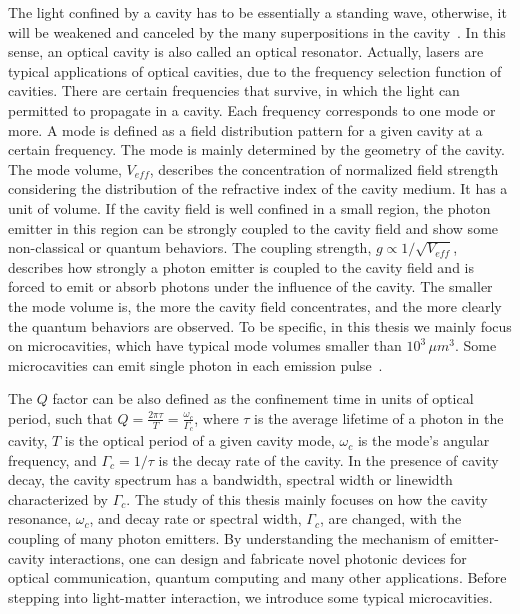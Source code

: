 The light confined by a cavity has to be essentially a standing wave, otherwise, it will be weakened and canceled by the many superpositions in the cavity~\cite{Novotny2006}. In this sense, an optical cavity is also called an optical resonator. Actually, lasers are typical applications of optical cavities, due to the frequency selection function of cavities. There are certain frequencies that survive, in which the light can permitted to propagate in a cavity. Each frequency corresponds to one mode or more. A mode is defined as a field distribution pattern for a given cavity at a certain frequency. The mode is mainly determined by the geometry of the cavity. The mode volume, $V_{eff}$, describes the concentration of normalized field strength considering the distribution of the refractive index of the cavity medium. It has a unit of volume. If the cavity field is well confined in a small region, the photon emitter in this region can be strongly coupled to the cavity field and show some non-classical or quantum behaviors. The coupling strength, $g\propto 1/\sqrt{V_{eff}}$, describes how strongly a photon emitter is coupled to the cavity field and is forced to emit or absorb photons under the influence of the cavity.  The smaller the mode volume is, the more the cavity field concentrates, and the more clearly the quantum behaviors are observed. To be specific, in this thesis we mainly focus on microcavities, which have typical mode volumes smaller than $10^3\,\mu m^3$. Some microcavities can emit single photon in each emission pulse~\cite{Schwagmann2011,Yao2009a}.

The $Q$ factor can be also defined as the confinement time in units of optical period, such that $Q=\frac{2\pi\tau}{T}=\frac{\omega_c}{\Gamma_c}$, where $\tau$ is the average lifetime of a photon in the cavity, $T$ is the optical period of a given cavity mode, $\omega_c$ is the mode's angular frequency, and $\Gamma_c=1/\tau$ is the decay rate of the cavity. In the presence of cavity decay, the cavity spectrum has a bandwidth, spectral width or linewidth characterized by $\Gamma_c$. The study of this thesis mainly focuses on how the cavity resonance, $\omega_c$, and decay rate or spectral width, $\Gamma_c$, are changed, with the coupling of many photon emitters. By understanding the mechanism of emitter-cavity interactions, one can design and fabricate novel photonic devices for optical communication, quantum computing and many other applications. Before stepping into light-matter interaction, we introduce some typical microcavities.

